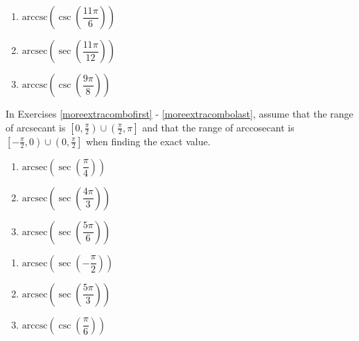 \begin{multicols}{3}

\begin{enumerate}

\setcounter{enumi}{\value{HW}}

\item  $\text{arccsc}\left(\csc\left(\dfrac{11\pi}{6}\right) \right)$ 
\item  $\text{arcsec}\left(\sec\left(\dfrac{11\pi}{12}\right) \right)$
\item  $\text{arccsc}\left(\csc\left(\dfrac{9\pi}{8}\right) \right)$ \label{extracombolast}

\setcounter{HW}{\value{enumi}}

\end{enumerate}

\end{multicols}

In Exercises \ref{moreextracombofirst} - \ref{moreextracombolast}, assume that the range of arcsecant is $\left[0, \frac{\pi}{2} \right) \cup \left( \frac{\pi}{2}, \pi \right]$ and that the range of arccosecant is $\left[ -\frac{\pi}{2}, 0 \right)  \cup \left(0, \frac{\pi}{2} \right]$ when finding the exact value.

\begin{multicols}{3}

\begin{enumerate}

\setcounter{enumi}{\value{HW}}

\item  $\text{arcsec}\left(\sec\left(\dfrac{\pi}{4}\right) \right)$  \label{moreextracombofirst}
\item  $\text{arcsec}\left(\sec\left(\dfrac{4\pi}{3}\right) \right)$
\item  $\text{arcsec}\left(\sec\left( \dfrac{5\pi}{6} \right) \right)$

\setcounter{HW}{\value{enumi}}

\end{enumerate}

\end{multicols}

\begin{multicols}{3}

\begin{enumerate}

\setcounter{enumi}{\value{HW}}

\item  $\text{arcsec}\left(\sec\left(-\dfrac{\pi}{2} \right) \right)$ 
\item  $\text{arcsec}\left(\sec\left(\dfrac{5\pi}{3}\right) \right)$
\item  $\text{arccsc}\left(\csc\left(\dfrac{\pi}{6}\right) \right)$ 

\setcounter{HW}{\value{enumi}}

\end{enumerate}

\end{multicols}


